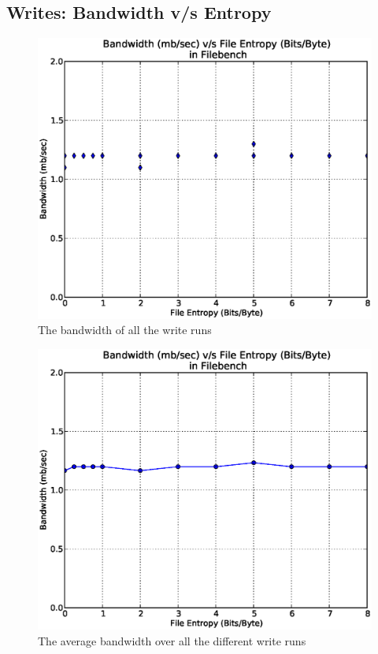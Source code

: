 \subsection{Writes: Bandwidth v/s Entropy}
\begin{figure}[H]
\begin{center}
\includegraphics[scale=.55]{../results/set2/write_bw_2.eps}
\caption{The bandwidth of all the write runs}
\label{fig:wb2}
\end{center}
\end{figure}

\begin{figure}[H]
\begin{center}
\includegraphics[scale=.55]{../results/set2/write_bw_avg_2.eps}
\caption{The average bandwidth over all the different write runs}
\label{fig:wbavg2}
\end{center}
\end{figure}

